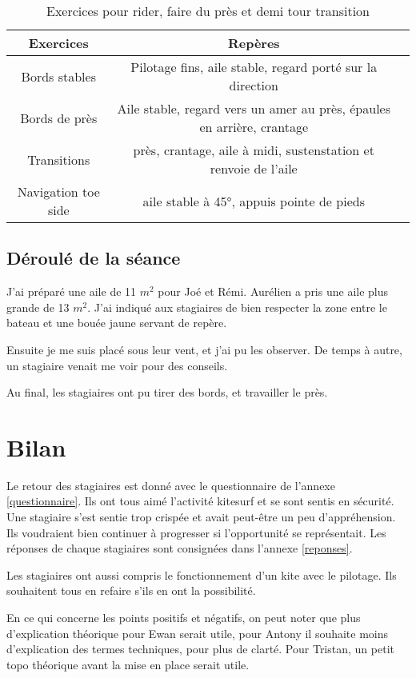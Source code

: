 \documentclass[11pt,a4paper]{report}
\begin{document}
\begin{table}[h]
\begin{tabular}{|c|c|c|}
\hline
\textbf{Exercices}     &  \textbf{Repères}      \\
\hline 
Bords stables & Pilotage fins, aile stable, regard porté sur la direction   \\
\hline
Bords de près  & Aile stable, regard vers un amer au près, épaules en arrière, crantage  \\
\hline 
Transitions & près, crantage, aile à midi, sustenstation et renvoie de l'aile \\
\hline
Navigation toe side   &  aile stable à 45°, appuis pointe de pieds   \\
\hline
\end{tabular}
\caption{Exercices pour rider, faire du près et demi tour transition\label{seance_pilotage2}}
\end{table}

\subsection{Déroulé de la séance}
J'ai préparé une aile de 11 $m^2$ pour Joé et Rémi. Aurélien a pris une aile plus
grande de 13 $m^2$. J'ai indiqué aux stagiaires de bien respecter
la zone entre le bateau et une bouée jaune servant de repère.

Ensuite je me suis placé sous leur vent, et j'ai pu les observer. 
De temps à autre, un stagiaire venait me voir pour des conseils.

Au final, les stagiaires ont pu tirer des bords, et travailler le près. 

\section{Bilan}
Le retour des stagiaires est donné avec le questionnaire de l'annexe \ref{questionnaire}.
Ils ont tous aimé l'activité kitesurf et se sont sentis en sécurité.
Une stagiaire s'est sentie trop crispée et avait peut-\^etre un peu d'appréhension.
Ils  voudraient bien continuer à progresser si l'opportunité se représentait.
Les réponses de chaque stagiaires sont consignées dans l'annexe \ref{reponses}.

Les stagiaires ont aussi compris le fonctionnement d'un kite avec le pilotage.
Ils souhaitent tous en refaire s'ils en ont la possibilité.

En ce qui concerne les points positifs et négatifs, on peut noter
que plus d'explication théorique pour Ewan serait utile, pour Antony
il souhaite moins d'explication des termes techniques, pour plus de clarté.
Pour Tristan, un petit topo théorique avant la mise en place serait utile.
\end{document}
